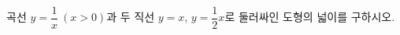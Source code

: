 \hspace*{2mm}\begin{minipage}[t]{\dimexpr\linewidth-2mm\relax}\vspace{0pt}
곡선 $y=\dfrac{1}{x}\ (x>0)$과 두 직선 $y=x$, $y=\dfrac{1}{2}x$로 둘러싸인 도형의 넓이를 구하시오.\end{minipage}

